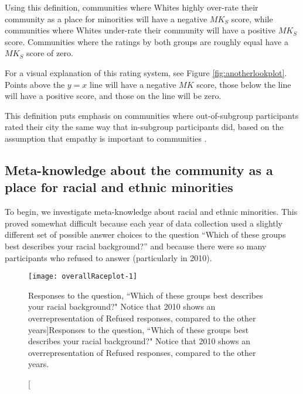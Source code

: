 \documentclass[smallextended]{svjour3}\usepackage[]{graphicx}\usepackage[]{color}
\newenvironment{knitrout}{}{} %
\begin{document}
Using this definition, communities where Whites highly over-rate their community as a place for minorities will have a negative $MK_S$ score, while communities where Whites under-rate their community will have a positive $MK_S$ score. Communities where the ratings by both groups are roughly equal have a $MK_S$ score of zero. 

For a visual explanation of this rating system, see Figure \ref{fig:anotherlookplot}. Points above the $y=x$ line will have a negative $MK$ score, those below the line will have a positive score, and those on the line will be zero.

This definition puts emphasis on communities where out-of-subgroup participants rated their city the same way that in-subgroup participants did, based on the assumption that empathy is important to communities \citep{SteFin1999}. 

\subsection{Meta-knowledge about the community as a place for racial and ethnic minorities}
\label{minorities}
To begin, we investigate meta-knowledge about racial and ethnic minorities. This proved somewhat difficult because each year of data collection used a slightly different set of possible answer choices to the question ``Which of these groups best describes your racial background?'' and because there were so many participants who refused to answer (particularly in 2010). 



\begin{knitrout}
\color{fgcolor}\begin{figure}

{\centering \texttt{[image: overallRaceplot-1]} 

}

\caption[Responses to the question, ``Which of these groups best describes your racial background?" Notice that 2010 shows an overrepresentation of Refused responses, compared to the other years]{Responses to the question, ``Which of these groups best describes your racial background?" Notice that 2010 shows an overrepresentation of Refused responses, compared to the other years.}\label{fig:overallRaceplot}
\end{figure}


\end{knitrout}
\end{document}
